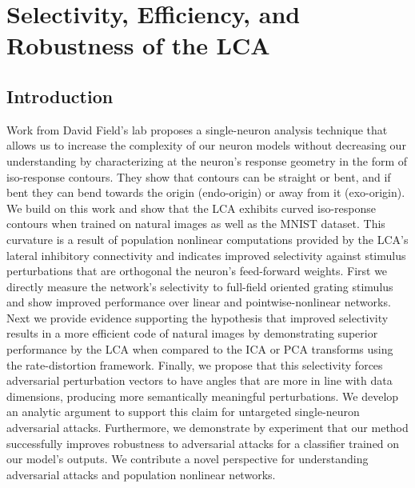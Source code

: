 \chapter{Selectivity, Efficiency, and Robustness of the LCA}

\section{Introduction}
Work from David Field's lab \parencite{golden2016conjectures,vilankar2017selectivity} proposes a single-neuron analysis technique that allows us to increase the complexity of our neuron models without decreasing our understanding by characterizing at the neuron’s response geometry in the form of iso-response contours.
They show that contours can be straight or bent, and if bent they can bend towards the origin (endo-origin) or away from it (exo-origin).
We build on this work and show that the LCA exhibits curved iso-response contours when trained on natural images as well as the MNIST dataset.
This curvature is a result of population nonlinear computations provided by the LCA's lateral inhibitory connectivity and indicates improved selectivity against stimulus perturbations that are orthogonal the neuron's feed-forward weights.
First we directly measure the network's selectivity to full-field oriented grating stimulus and show improved performance over linear and pointwise-nonlinear networks.
Next we provide evidence supporting the hypothesis that improved selectivity results in a more efficient code of natural images by demonstrating superior performance by the LCA when compared to the ICA or PCA transforms using the rate-distortion framework.
Finally, we propose that this selectivity forces adversarial perturbation vectors to have angles that are more in line with data dimensions, producing more semantically meaningful perturbations.
We develop an analytic argument to support this claim for untargeted single-neuron adversarial attacks.
Furthermore, we demonstrate by experiment that our method successfully improves robustness to adversarial attacks for a classifier trained on our model's outputs.
We contribute a novel perspective for understanding adversarial attacks and population nonlinear networks. 

